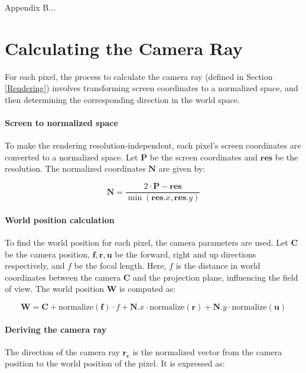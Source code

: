 \label{Ray}

Appendix B...

\section{Calculating the Camera Ray}

For each pixel, the process to calculate the camera ray (defined in Section \ref{Rendering}) involves transforming screen coordinates to a normalized space, and then determining the corresponding direction in the world space.

\paragraph{Screen to normalized space}
To make the rendering resolution-independent, each pixel's screen coordinates are converted to a normalized space. Let $\mathbf{P}$ be the screen coordinates and $\mathbf{res}$ be the resolution. The normalized coordinates $\mathbf{N}$ are given by:

\begin{equation}
   \mathbf{N} = \frac{2 \cdot \mathbf{P} - \mathbf{res}}{\min(\mathbf{res}.x, \mathbf{res}.y)}
\end{equation}

\paragraph{World position calculation}
To find the world position for each pixel, the camera parameters are used. Let $\mathbf{C}$ be the camera position, $\mathbf{f}, \mathbf{r}, \mathbf{u}$ be the forward, right and up directions respectively, and $f$ be the focal length. Here, $f$ is the distance in world coordinates between the camera $\mathbf{C}$ and the projection plane, influencing the field of view. The world position $\mathbf{W}$ is computed as:

\begin{equation}
   \mathbf{W} = \mathbf{C} + \text{normalize}(\mathbf{f}) \cdot f + \mathbf{N}.x \cdot \text{normalize}(\mathbf{r}) + \mathbf{N}.y \cdot \text{normalize}(\mathbf{u})
\end{equation}

\paragraph{Deriving the camera ray}
The direction of the camera ray $\mathbf{r_c}$ is the normalized vector from the camera position to the world position of the pixel. It is expressed as:

